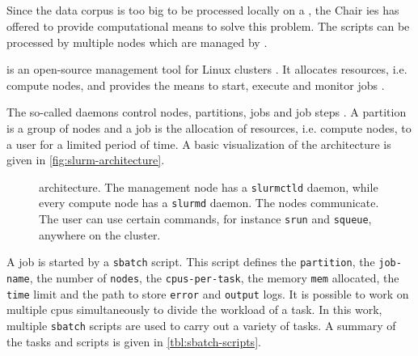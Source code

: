 
\subsection{\slurm{}}\label{subsec:slurm}

Since the data corpus is too big to be processed locally on a \localMaschineStats{}, the Chair \ac{ies} has offered to provide computational means to solve this problem.
The scripts can be processed by multiple nodes which are managed by \slurm{}.

\slurm{} is an open-source management tool for Linux clusters \cite{slurm-online}.
It allocates resources, i.e. compute nodes, and provides the means to start, execute and monitor jobs \cite{slurm-online, slurm2003}.

The so-called \slurm{} daemons control nodes, partitions, jobs and job steps \cite{slurm-online}.
A partition is a group of nodes and a job is the allocation of resources, i.e. compute nodes, to a user for a limited period of time.
A basic visualization of the architecture is given in \autoref{fig:slurm-architecture}.

\begin{figure}[!htb] %
    \centering
    
    \caption[\slurm{} architecture]{\slurm{} architecture. The management node has a \texttt{slurmctld} daemon, while every compute node has a \texttt{slurmd} daemon.
    The nodes communicate.
    The user can use certain commands, for instance \texttt{srun} and \texttt{squeue}, anywhere on the cluster.
    }
    \label{fig:slurm-architecture}
\end{figure}

A job is started by a \texttt{sbatch} script.
This script defines the \texttt{partition}, the \texttt{job-name}, the number of \texttt{nodes}, the \texttt{cpus-per-task}, the memory \texttt{mem} allocated, 
the \texttt{time} limit and the path to store \texttt{error} and \texttt{output} logs.
It is possible to work on multiple \acp{cpu} simultaneously to divide the workload of a task.
In this work, multiple \texttt{sbatch} scripts are used to carry out a variety of tasks.
A summary of the tasks and scripts is given in \autoref{tbl:sbatch-scripts}.


